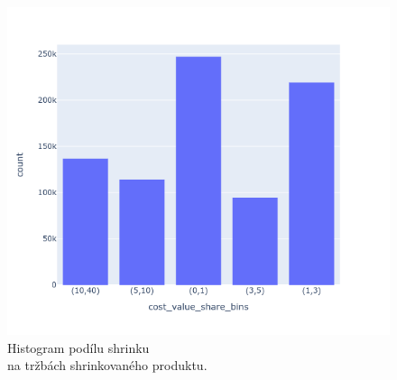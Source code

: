 \vspace*{-2em}

\begin{figure}[h!]
    \centering
    \begin{minipage}[b]{.55\textwidth}
      \centering
      \captionsetup{justification=centering}

      \includegraphics[width=\textwidth]{obrazky/grafy/histogram/newplot.png}
      \vspace*{-3em}
      \caption{Histogram podílu shrinku \\na tržbách shrinkovaného produktu.}
      \label{obr:nb:hist3}
    \end{minipage}%
    \hspace*{-2em}
    \begin{minipage}[b]{.55\textwidth}
        \centering
        \captionsetup{justification=centering}
  

\end{minipage}
\end{figure}
